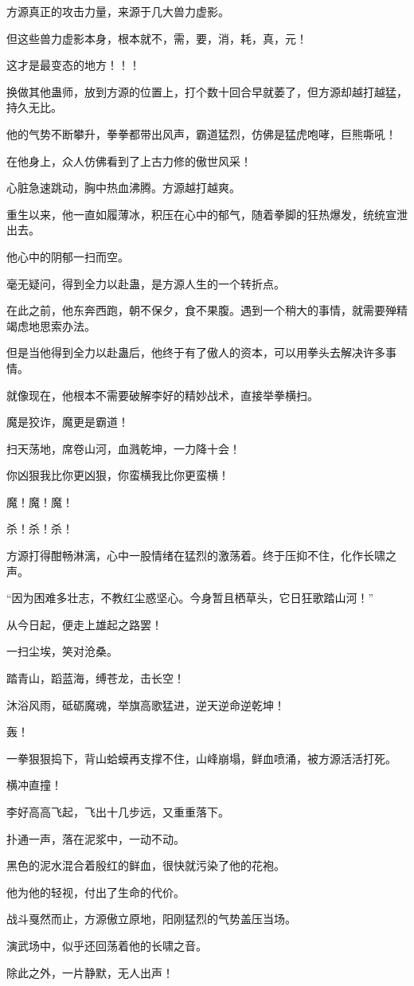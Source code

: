 \begin{this_body}
方源真正的攻击力量，来源于几大兽力虚影。

但这些兽力虚影本身，根本就不，需，要，消，耗，真，元！

这才是最变态的地方！！！

换做其他蛊师，放到方源的位置上，打个数十回合早就萎了，但方源却越打越猛，持久无比。

他的气势不断攀升，拳拳都带出风声，霸道猛烈，仿佛是猛虎咆哮，巨熊嘶吼！

在他身上，众人仿佛看到了上古力修的傲世风采！

心脏急速跳动，胸中热血沸腾。方源越打越爽。

重生以来，他一直如履薄冰，积压在心中的郁气，随着拳脚的狂热爆发，统统宣泄出去。

他心中的阴郁一扫而空。

毫无疑问，得到全力以赴蛊，是方源人生的一个转折点。

在此之前，他东奔西跑，朝不保夕，食不果腹。遇到一个稍大的事情，就需要殚精竭虑地思索办法。

但是当他得到全力以赴蛊后，他终于有了傲人的资本，可以用拳头去解决许多事情。

就像现在，他根本不需要破解李好的精妙战术，直接举拳横扫。

魔是狡诈，魔更是霸道！

扫天荡地，席卷山河，血溅乾坤，一力降十会！

你凶狠我比你更凶狠，你蛮横我比你更蛮横！

魔！魔！魔！

杀！杀！杀！

方源打得酣畅淋漓，心中一股情绪在猛烈的激荡着。终于压抑不住，化作长啸之声。

“因为困难多壮志，不教红尘惑坚心。今身暂且栖草头，它日狂歌踏山河！”

从今日起，便走上雄起之路罢！

一扫尘埃，笑对沧桑。

踏青山，蹈蓝海，缚苍龙，击长空！

沐浴风雨，砥砺魔魂，举旗高歌猛进，逆天逆命逆乾坤！

轰！

一拳狠狠捣下，背山蛤蟆再支撑不住，山峰崩塌，鲜血喷涌，被方源活活打死。

横冲直撞！

李好高高飞起，飞出十几步远，又重重落下。

扑通一声，落在泥浆中，一动不动。

黑色的泥水混合着殷红的鲜血，很快就污染了他的花袍。

他为他的轻视，付出了生命的代价。

战斗戛然而止，方源傲立原地，阳刚猛烈的气势盖压当场。

演武场中，似乎还回荡着他的长啸之音。

除此之外，一片静默，无人出声！

\end{this_body}

